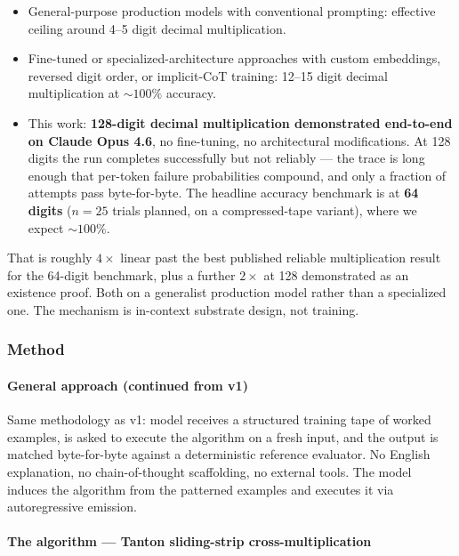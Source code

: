 \documentclass[twocolumn,switch,10pt]{article}
\providecommand{\tightlist}{\setlength{\itemsep}{0pt}\setlength{\parskip}{0pt}}
\begin{document}
\begin{itemize}
\tightlist
\item
  General-purpose production models with conventional prompting:
  effective ceiling around 4--5 digit decimal multiplication.
\item
  Fine-tuned or specialized-architecture approaches with custom
  embeddings, reversed digit order, or implicit-CoT training: 12--15
  digit decimal multiplication at \(\sim 100\%\) accuracy.
\item
  This work: \textbf{128-digit decimal multiplication demonstrated
  end-to-end on Claude Opus 4.6}, no fine-tuning, no architectural
  modifications. At 128 digits the run completes successfully but
  not reliably --- the trace is long enough that per-token failure
  probabilities compound, and only a fraction of attempts pass
  byte-for-byte. The headline accuracy benchmark is at \textbf{64 digits}
  (\(n = 25\) trials planned, on a compressed-tape variant), where we
  expect \(\sim 100\%\).
\end{itemize}

That is roughly \(4\times\) linear past the best published reliable
multiplication result for the 64-digit benchmark, plus a further
\(2\times\) at 128 demonstrated as an existence proof. Both on a
generalist production model rather than a specialized one. The
mechanism is in-context substrate design, not training.

\subsubsection{Method}\label{method}

\paragraph{General approach (continued from v1)}\label{general-approach-continued-from-v1}

Same methodology as v1: model receives a structured training tape of
worked examples, is asked to execute the algorithm on a fresh input,
and the output is matched byte-for-byte against a deterministic
reference evaluator. No English explanation, no chain-of-thought
scaffolding, no external tools. The model induces the algorithm from
the patterned examples and executes it via autoregressive emission.

\paragraph{The algorithm --- Tanton sliding-strip cross-multiplication}\label{the-algorithm-tanton-sliding-strip-cross-multiplication}
\end{document}
